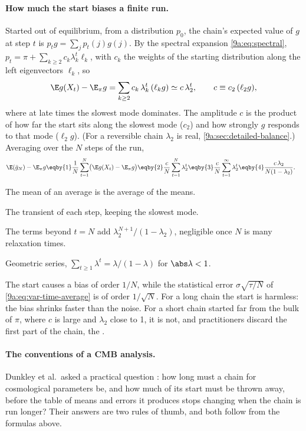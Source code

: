 \paragraph{How much the start biases a finite run.}
Started out of equilibrium, from a distribution $p_0$, the chain's expected value of $g$ at
step $t$ is $p_tg=\sum_jp_t(j)g(j)$. By the spectral expansion \eqref{9a:eq:spectral},
$p_t=\pi+\sum_{k\ge2}c_k\lambda_k^t\ell_k$, with $c_k$ the weights of the starting distribution
along the left eigenvectors $\ell_k$, so
\begin{equation*}
  \E g(X_t)-\E_\pi g=\sum_{k\ge2}c_k\,\lambda_k^t\,(\ell_kg)\simeq c\,\lambda_2^t,
  \qquad c\equiv c_2\,(\ell_2g),
\end{equation*}
where at late times the slowest mode dominates. The amplitude $c$ is the product of how far the
start sits along the slowest mode ($c_2$) and how strongly $g$ responds to that mode ($\ell_2g$).
(For a reversible chain $\lambda_2$ is real, \cref{9a:sec:detailed-balance}.) Averaging over the
$N$ steps of the run,
\begin{align}
  \E(\bar g_N)-\E_\pi g
  &\eqby{1}\frac1N\sum_{t=1}^N\bigl(\E g(X_t)-\E_\pi g\bigr)
   \eqby{2}\frac cN\sum_{t=1}^N\lambda_2^t
   \eqby{3}\frac cN\sum_{t=1}^\infty\lambda_2^t
   \eqby{4}\frac{c\,\lambda_2}{N(1-\lambda_2)} .
  \label{9a:eq:burnin-bias}
\end{align}
\begin{explain}
  \item The mean of an average is the average of the means.
  \item The transient of each step, keeping the slowest mode.
  \item The terms beyond $t=N$ add $\lambda_2^{N+1}/(1-\lambda_2)$, negligible once
        $N$ is many relaxation times.
  \item Geometric series, $\sum_{t\ge1}\lambda^t=\lambda/(1-\lambda)$ for $\abs\lambda<1$.
\end{explain}
The start causes a bias of order $1/N$, while the statistical error $\sigma\sqrt{\tau/N}$ of
\eqref{9a:eq:var-time-average} is of order $1/\sqrt N$. For a long chain the start is harmless:
the bias shrinks faster than the noise. For a short chain started far from the bulk of $\pi$,
where $c$ is large and $\lambda_2$ close to 1, it is not, and practitioners discard the first
part of the chain, the .

\paragraph{The conventions of a CMB analysis.}
Dunkley et al.\ asked a practical question \cite{Dunkley2005}: how long must a chain for
cosmological parameters be, and how much of its start must be thrown away, before the table of
means and errors it produces stops changing when the chain is run longer? Their answers are two
rules of thumb, and both follow from the formulas above.

